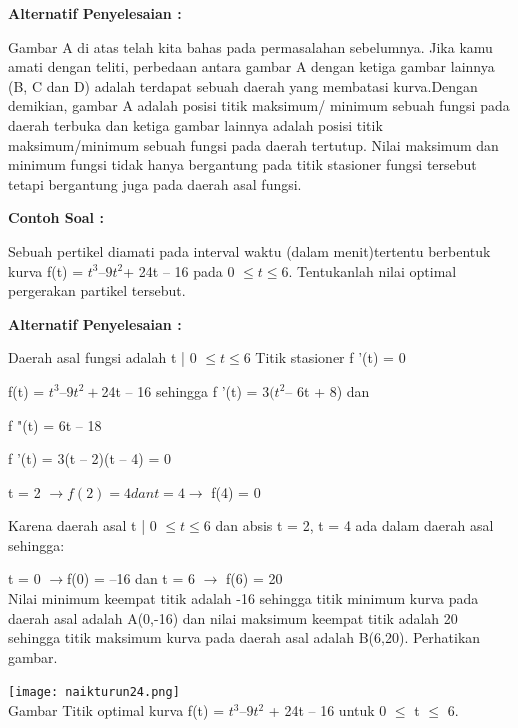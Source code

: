 \documentclass[11pt,fleqn]{book} %
\begin{document}
\begin{flushleft}
\textbf{Alternatif Penyelesaian :}
\end{flushleft}

Gambar A di atas telah kita bahas pada permasalahan
sebelumnya. Jika kamu amati dengan teliti, perbedaan antara gambar A dengan ketiga gambar lainnya (B, C dan D) adalah terdapat sebuah daerah yang membatasi kurva.Dengan demikian, gambar A adalah posisi titik maksimum/ minimum sebuah fungsi pada daerah terbuka dan ketiga gambar lainnya adalah posisi titik maksimum/minimum sebuah fungsi pada daerah tertutup. Nilai maksimum dan minimum fungsi tidak hanya bergantung pada titik stasioner fungsi tersebut tetapi bergantung juga pada daerah asal fungsi.


\begin{flushleft}
\textbf{Contoh Soal :}
\end{flushleft}

Sebuah pertikel diamati pada interval waktu (dalam menit)tertentu berbentuk kurva f(t) = $t^{3} – 9t^{2} $+ 24t – 16 pada 0 $\leq t \leq 6.$ Tentukanlah nilai optimal pergerakan partikel tersebut.

\begin{flushleft}
\textbf{Alternatif Penyelesaian :}
\end{flushleft}

Daerah asal fungsi adalah {t | 0 $\leq t \leq $6} Titik stasioner
f '(t) = 0

f(t) = $t^{3} – 9t^{2} + $24t – 16 sehingga f '(t) = 3$(t^{2} $– 6t + 8) dan

f "(t) = 6t – 18

f '(t) = 3(t – 2)(t – 4) = 0

t = 2 $\rightarrow f (2) = 4 dan t = 4 \rightarrow$ f(4) = 0

Karena daerah asal {t | 0 $\leq t \leq $6} dan absis t = 2, t = 4 ada dalam daerah asal sehingga:

t = 0 $\rightarrow $f(0) = –16 dan t = 6 $\rightarrow$ f(6) = 20\\

Nilai minimum keempat titik adalah -16 sehingga titik
minimum kurva pada daerah asal adalah A(0,-16) dan
nilai maksimum keempat titik adalah 20 sehingga titik
maksimum kurva pada daerah asal adalah B(6,20).
Perhatikan gambar.

\begin{center}
\texttt{[image: naikturun24.png]}\\
Gambar Titik optimal kurva f(t) = $t^{3} – 9t^{2}$ + 24t – 16
untuk 0 $\leq$ t $\leq$ 6.
\end{center}
\end{document}
